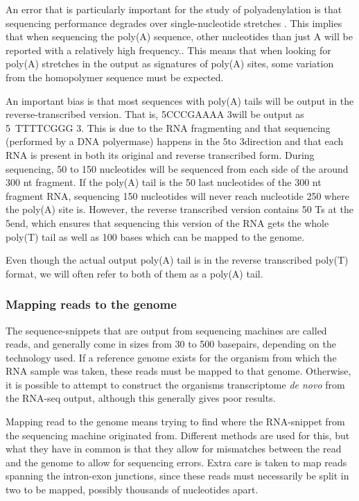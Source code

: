 An error that is particularly important for the study of polyadenylation is
that sequencing performance degrades over single-nucleotide stretches
\cite{minoche_evaluation_2011}. This implies that when sequencing the poly(A)
sequence, other nucleotides than just A will be reported with a relatively high
frequency.. This means that when looking for poly(A) stretches in the output as
signatures of poly(A) sites, some variation from the homopolymer sequence must
be expected.

An important bias is that most sequences with poly(A) tails will be output in
the reverse-transcribed version. That is, 5\p CCCGAAAA 3\p will be output as 5\
TTTTCGGG 3\p. This is due to the RNA fragmenting and that sequencing
(performed by a DNA polyermase) happens in the 5\p to 3\p direction and that
each RNA is present in both its original and reverse transcribed form. During
sequencing, 50 to 150 nucleotides will be sequenced from each side of the around
300 nt fragment. If the poly(A) tail is the 50 last nucleotides of the 300 nt
fragment RNA, sequencing 150 nucleotides will never reach nucleotide 250 where
the poly(A) site is. However, the reverse transcribed version contains 50 Ts at
the 5\p end, which ensures that sequencing this version of the RNA gets the
whole poly(T) tail as well as 100 bases which can be mapped to the genome.

Even though the actual output poly(A) tail is in the reverse transcribed
poly(T) format, we will often refer to both of them as a poly(A) tail.

\subsubsection{Mapping reads to the genome}
The sequence-snippets that are output from sequencing machines are called
reads, and generally come in sizes from 30 to 500 basepairs, depending on the
technology used. If a reference genome exists for the organism from which the
RNA sample was taken, these reads must be mapped to that genome. Otherwise, it
is possible to attempt to construct the organisms transcriptome \textit{de
novo} from the RNA-seq output, although this generally gives poor results.

Mapping read to the genome means trying to find where the RNA-snippet from the
sequencing machine originated from. Different methods are used for this, but
what they have in common is that they allow for mismatches between the read and
the genome to allow for sequencing errors. Extra care is taken to map reads
spanning the intron-exon junctions, since these reads must necessarily be split
in two to be mapped, possibly thousands of nucleotides apart.

